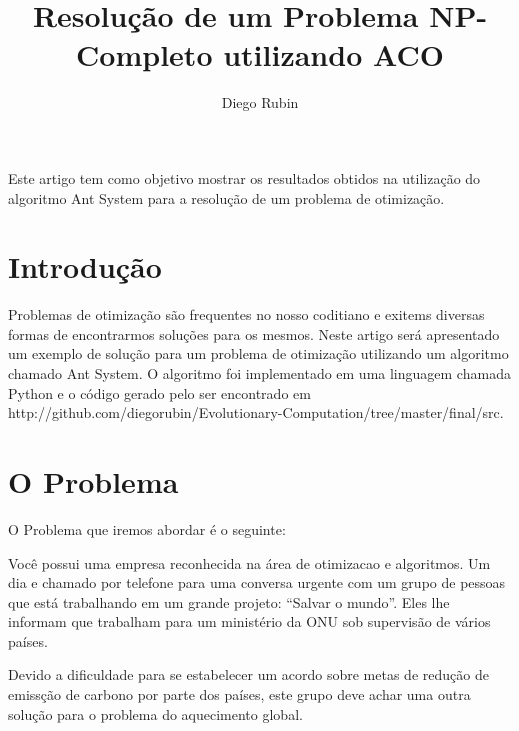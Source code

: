\documentclass[12pt]{article}
\title{Resolução de um Problema NP-Completo utilizando ACO}
\author{Diego Rubin\inst{1}}
\begin{document}
 

\maketitle

\begin{abstract}
\end{abstract}

\begin{resumo} 
 Este artigo tem como objetivo mostrar os
 resultados obtidos na utilização do algoritmo
 Ant System para a resolução de um problema
 de otimização.
\end{resumo}


\section{Introdução}

Problemas de otimização são frequentes no nosso coditiano e exitems 
diversas formas de encontrarmos soluções para os mesmos. Neste artigo
será apresentado um exemplo de solução para um problema de otimização
utilizando um algoritmo chamado Ant System.
O algoritmo foi implementado em uma linguagem chamada Python e o 
código gerado pelo ser encontrado em http://github.com/diegorubin/Evolutionary-Computation/tree/master/final/src.

\section{O Problema} \label{sec:firstpage}

O Problema que iremos abordar é o seguinte:

Você possui uma empresa reconhecida na área de otimizacao e algoritmos. 
Um dia e chamado por telefone para uma conversa urgente com um grupo 
de pessoas que está trabalhando em um grande projeto: “Salvar o mundo”. 
Eles lhe informam que trabalham para um ministério da ONU sob 
supervisão de vários países.

Devido a dificuldade para se estabelecer um acordo sobre metas de 
redução de emissção de carbono por parte dos países, este grupo deve 
achar uma outra solução para o problema do aquecimento global. 
\end{document}
